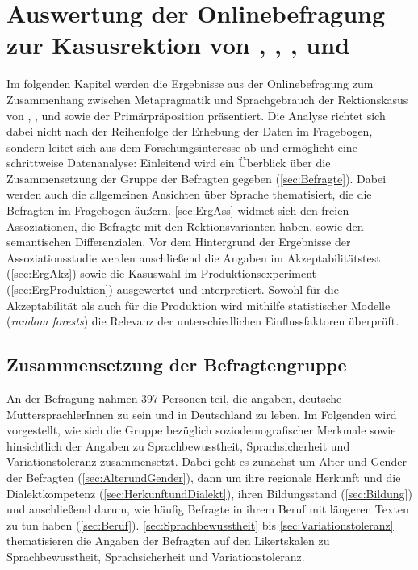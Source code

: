 \chapter[Auswertung der Onlinebefragung zur Kasusrektion]{Auswertung der Onlinebefragung zur Kasusrektion von , , ,  und }
\label{cha:Ergebnisse}
Im folgenden Kapitel werden die Ergebnisse aus der Onlinebefragung zum Zusammenhang zwischen Metapragmatik und Sprachgebrauch der Rektionskasus von \wegen, \waehrend, \dank{} und \gegenueber{} sowie der Primärpräposition  präsentiert. 
Die Analyse richtet sich dabei nicht nach der Reihenfolge der Erhebung der Daten im Fragebogen, sondern leitet sich aus dem Forschungsinteresse ab und ermöglicht eine schrittweise Datenanalyse:
Einleitend wird ein Überblick über die Zusammensetzung der Gruppe der Befragten gegeben (\autoref{sec:Befragte}).
Dabei werden auch die allgemeinen Ansichten über Sprache thematisiert, die die Befragten im Fragebogen äußern. 
\autoref{sec:ErgAss} widmet sich den freien Assoziationen, die Befragte mit den Rektionsvarianten haben, sowie den semantischen Differenzialen. 
Vor dem Hintergrund der Ergebnisse der Assoziationsstudie werden anschließend die Angaben im Akzeptabilitätstest (\autoref{sec:ErgAkz}) sowie die Kasuswahl im Produktionsexperiment (\autoref{sec:ErgProduktion}) ausgewertet und interpretiert. %
Sowohl für die Akzeptabilität als auch für die Produktion wird mithilfe statistischer Modelle (\textit{random forests}) die Relevanz der unterschiedlichen Einflussfaktoren überprüft.%
\section{Zusammensetzung der Befragtengruppe}
\label{sec:Befragte}
An der Befragung nahmen 397 Personen teil, die angaben, deutsche MuttersprachlerInnen zu sein und in Deutschland zu leben. 
Im Folgenden wird vorgestellt, wie sich die Gruppe bezüglich soziodemografischer Merkmale sowie hinsichtlich der Angaben zu Sprachbewusstheit, Sprachsicherheit und Variationstoleranz zusammensetzt. 
Dabei geht es zunächst um Alter und Gender der Befragten (\autoref{sec:AlterundGender}), dann um ihre regionale Herkunft und die Dialektkompetenz (\autoref{sec:HerkunftundDialekt}), ihren Bildungsstand (\autoref{sec:Bildung}) und anschließend darum, wie häufig Befragte in ihrem Beruf mit längeren Texten zu tun haben (\autoref{sec:Beruf}). 
\autoref{sec:Sprachbewusstheit} bis \autoref{sec:Variationstoleranz} thematisieren die Angaben der Befragten auf den Likertskalen zu Sprachbewusstheit, Sprachsicherheit und Variationstoleranz.  
